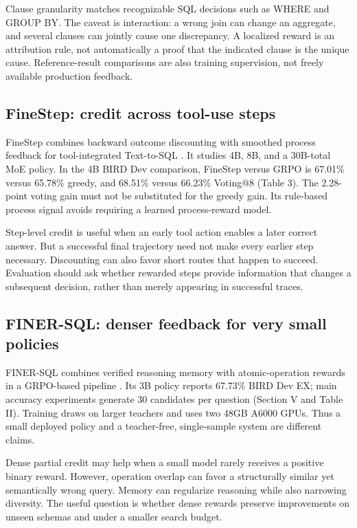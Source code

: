 \documentclass[11pt,a4paper]{article}
\begin{document}
Clause granularity matches recognizable SQL decisions such as WHERE and GROUP BY. The caveat is interaction: a wrong join can change an aggregate, and several clauses can jointly cause one discrepancy. A localized reward is an attribution rule, not automatically a proof that the indicated clause is the unique cause. Reference-result comparisons are also training supervision, not freely available production feedback.

\subsection{FineStep: credit across tool-use steps}
FineStep combines backward outcome discounting with smoothed process feedback for tool-integrated Text-to-SQL \cite{finestep}. It studies 4B, 8B, and a 30B-total MoE policy. In the 4B BIRD Dev comparison, FineStep versus GRPO is 67.01\% versus 65.78\% greedy, and 68.51\% versus 66.23\% Voting@8 (Table 3). The 2.28-point voting gain must not be substituted for the greedy gain. Its rule-based process signal avoids requiring a learned process-reward model.

Step-level credit is useful when an early tool action enables a later correct answer. But a successful final trajectory need not make every earlier step necessary. Discounting can also favor short routes that happen to succeed. Evaluation should ask whether rewarded steps provide information that changes a subsequent decision, rather than merely appearing in successful traces.

\subsection{FINER-SQL: denser feedback for very small policies}
FINER-SQL combines verified reasoning memory with atomic-operation rewards in a GRPO-based pipeline \cite{finer}. Its 3B policy reports 67.73\% BIRD Dev EX; main accuracy experiments generate 30 candidates per question (Section V and Table II). Training draws on larger teachers and uses two 48GB A6000 GPUs. Thus a small deployed policy and a teacher-free, single-sample system are different claims.

Dense partial credit may help when a small model rarely receives a positive binary reward. However, operation overlap can favor a structurally similar yet semantically wrong query. Memory can regularize reasoning while also narrowing diversity. The useful question is whether dense rewards preserve improvements on unseen schemas and under a smaller search budget.
\end{document}
